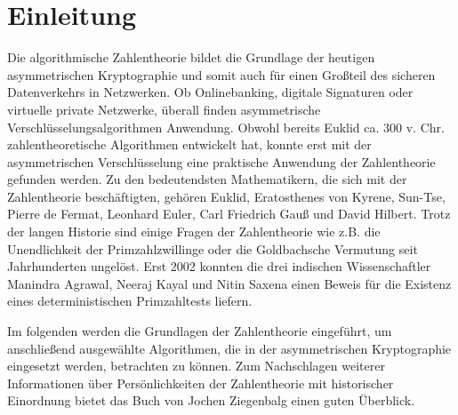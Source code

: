 \section{Einleitung}
	Die algorithmische Zahlentheorie bildet die Grundlage der heutigen asymmetrischen Kryptographie und somit auch für einen Großteil des sicheren Datenverkehrs in Netzwerken. Ob Onlinebanking, digitale Signaturen oder virtuelle private Netzwerke, überall finden asymmetrische Verschlüsselungsalgorithmen Anwendung. Obwohl bereits Euklid ca. 300 v. Chr. zahlentheoretische Algorithmen entwickelt hat, konnte erst mit der asymmetrischen Verschlüsselung eine praktische Anwendung der Zahlentheorie gefunden werden. Zu den bedeutendsten Mathematikern, die sich mit der Zahlentheorie beschäftigten, gehören Euklid, Eratosthenes von Kyrene, Sun-Tse, Pierre de Fermat, Leonhard Euler, Carl Friedrich Gauß und David Hilbert. Trotz der langen Historie sind einige Fragen der Zahlentheorie wie z.B. die Unendlichkeit der Primzahlzwillinge oder die Goldbachsche Vermutung seit Jahrhunderten ungelöst. Erst 2002 konnten die drei indischen Wissenschaftler Manindra Agrawal, Neeraj Kayal und Nitin Saxena einen Beweis für die Existenz eines deterministischen Primzahltests liefern.\cite{Primes:is:in:P}
	
	Im folgenden werden die Grundlagen der Zahlentheorie eingeführt, um anschließend ausgewählte Algorithmen, die in der asymmetrischen Kryptographie eingesetzt werden, betrachten zu können. Zum Nachschlagen weiterer Informationen über Persönlichkeiten der Zahlentheorie mit historischer Einordnung bietet das Buch \cite{Elementare:Zahlentheorie} von Jochen Ziegenbalg einen guten Überblick.